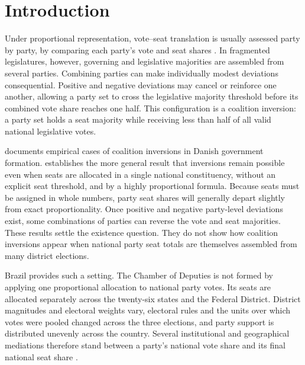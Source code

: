 \documentclass[11pt]{article}
\begin{document}
\section{Introduction}

Under proportional representation, vote--seat translation is usually assessed
party by party, by comparing each party's vote and seat shares
\parencite{kaminski26_propor_repres_primer}. In fragmented legislatures,
however, governing and legislative majorities are assembled from several
parties. Combining parties can make individually modest deviations
consequential. Positive and negative deviations may cancel or reinforce one
another, allowing a party set to cross the legislative majority threshold before
its combined vote share reaches one half. This configuration is a coalition
inversion: a party set holds a seat majority while receiving less than half of
all valid national legislative votes.
 


\textcite{kurrild-klitgaard13_elect_inver_coalit_propor_repres} documents empirical cases of coalition inversions in Danish government
formation. \textcite{miller14_elect_inver_under_propor_repres} establishes the more general result that inversions remain
possible even when seats are allocated in a single national constituency,
without an explicit seat threshold, and by a highly proportional formula.
Because seats must be assigned in whole numbers, party seat shares will
generally depart slightly from exact proportionality. Once positive and negative
party-level deviations exist, some combinations of parties can reverse the vote
and seat majorities. These results settle the existence question. They do not
show how coalition inversions appear when national party seat totals are
themselves assembled from many district elections.

Brazil provides such a setting. The Chamber of Deputies is not formed by
applying one proportional allocation to national party votes. Its seats are
allocated separately across the twenty-six states and the Federal District.
District magnitudes and electoral weights vary, electoral rules and the units
over which votes were pooled changed across the three elections, and party
support is distributed unevenly across the country. Several institutional and
geographical mediations therefore stand between a party's national vote share
and its final national seat share \parencite{bochsler2026winners}. 
\end{document}
